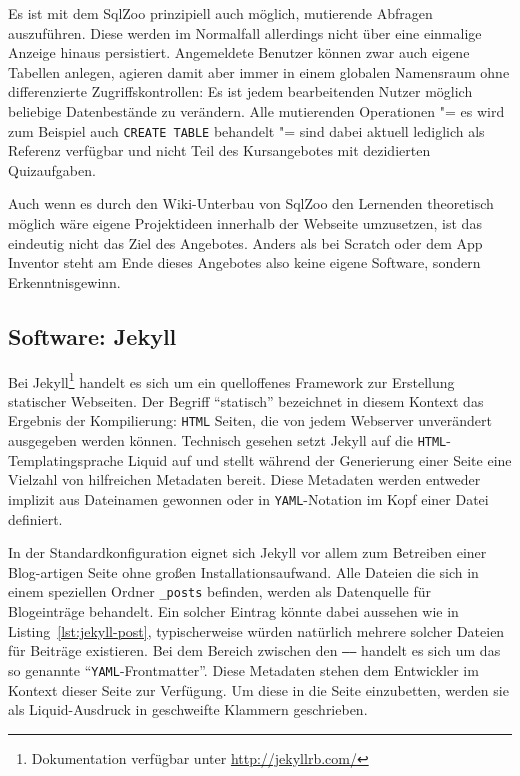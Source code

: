 Es ist mit dem SqlZoo prinzipiell auch möglich, mutierende Abfragen auszuführen. Diese werden im Normalfall allerdings nicht über eine einmalige Anzeige hinaus persistiert. Angemeldete Benutzer können zwar auch eigene Tabellen anlegen, agieren damit aber immer in einem globalen Namensraum ohne differenzierte Zugriffskontrollen: Es ist jedem bearbeitenden Nutzer möglich beliebige Datenbestände zu verändern. Alle mutierenden Operationen "= es wird zum Beispiel auch \lstinline{CREATE TABLE} behandelt "= sind dabei aktuell lediglich als Referenz verfügbar und nicht Teil des Kursangebotes mit dezidierten Quizaufgaben.

Auch wenn es durch den Wiki-Unterbau von SqlZoo den Lernenden theoretisch möglich wäre eigene Projektideen innerhalb der Webseite umzusetzen, ist das eindeutig nicht das Ziel des Angebotes. Anders als bei Scratch oder dem App Inventor steht am Ende dieses Angebotes also keine eigene Software, sondern Erkenntnisgewinn.

\subsection{Software: Jekyll}
\label{sec:software-jekyll}
Bei Jekyll\footnote{Dokumentation verfügbar unter \url{http://jekyllrb.com/}} handelt es sich um ein quelloffenes Framework zur Erstellung statischer Webseiten. Der Begriff "`statisch"' bezeichnet in diesem Kontext das Ergebnis der Kompilierung: \texttt{HTML} Seiten, die von jedem Webserver unverändert ausgegeben werden können. Technisch gesehen setzt Jekyll auf die \texttt{HTML}-Templatingsprache Liquid auf und stellt während der Generierung einer Seite eine Vielzahl von hilfreichen Metadaten bereit. Diese Metadaten werden entweder implizit aus Dateinamen gewonnen oder in \texttt{YAML}-Notation im Kopf einer Datei definiert.

In der Standardkonfiguration eignet sich Jekyll vor allem zum Betreiben einer Blog-artigen Seite ohne großen Installationsaufwand. Alle Dateien die sich in einem speziellen Ordner \texttt{\_posts} befinden, werden als Datenquelle für Blogeinträge behandelt. Ein solcher Eintrag könnte dabei aussehen wie in Listing~\ref{lst:jekyll-post}, typischerweise würden natürlich mehrere solcher Dateien für Beiträge existieren. Bei dem Bereich zwischen den \texttt{------} handelt es sich um das so genannte "`\texttt{YAML}-Frontmatter"'. Diese Metadaten stehen dem Entwickler im Kontext dieser Seite zur Verfügung. Um diese in die Seite einzubetten, werden sie als Liquid-Ausdruck in geschweifte Klammern geschrieben.

